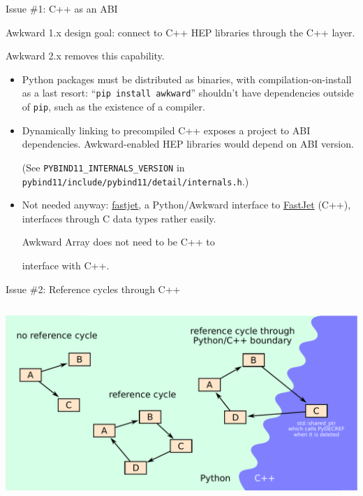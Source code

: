 \documentclass[aspectratio=169]{beamer}
\begin{document}
\begin{frame}{Issue \#1: C++ as an ABI}
\large

\vspace{0.5 cm}
Awkward 1.x design goal: connect to C++ HEP libraries through the C++ layer.

\vspace{0.25 cm}
Awkward 2.x removes this capability.

\vspace{0.25 cm}
\begin{itemize}\setlength{\itemsep}{0.25 cm}
\item<2-> Python packages must be distributed as binaries, with compilation-on-install as a last resort: ``\texttt{pip install awkward}'' shouldn't have dependencies outside of \texttt{pip}, such as the existence of a compiler.

\item<3-> Dynamically linking to precompiled C++ exposes a project to ABI dependencies. Awkward-enabled HEP libraries would depend on ABI version.

{\scriptsize (See \texttt{PYBIND11_INTERNALS_VERSION} in \texttt{pybind11/include/pybind11/detail/internals.h}.)}

\item<4-> Not needed anyway: \textcolor{blue}{\href{https://github.com/scikit-hep/fastjet}{fastjet}}, a Python/Awkward interface to \textcolor{blue}{\href{http://fastjet.fr/}{FastJet}} (C++), interfaces through C data types rather easily.

\vspace{0.25 cm}
Awkward Array does not need to be C++ to

interface with C++.
\end{itemize}

\vspace{-1.65 cm}
\hfill {}

\vspace{-0.15 cm}
\hfill {}
\end{frame}

\begin{frame}{Issue \#2: Reference cycles through C++}
\vspace{0.15 cm}

\begin{columns}
\includegraphics[width=\linewidth]{python-cpp-reference-cycles.pdf}
\end{columns}
\end{frame}
\end{document}
